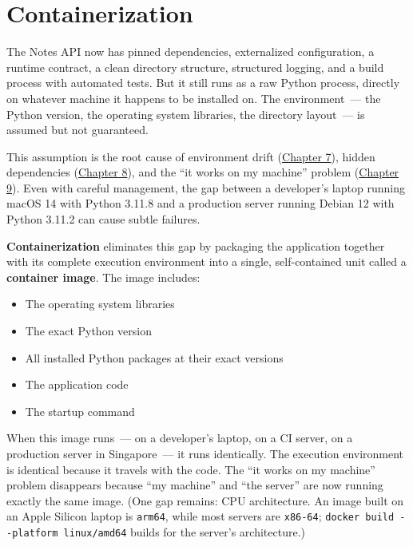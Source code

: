 \setcounter{chapter}{17}
\chapter{Containerization}\label{ch:18-containerization}

\chapterrule

The Notes API now has pinned dependencies, externalized configuration, a runtime contract, a clean directory structure, structured logging, and a build process with automated tests. But it still runs as a raw Python process, directly on whatever machine it happens to be installed on. The environment~--- the Python version, the operating system libraries, the directory layout~--- is assumed but not guaranteed.

This assumption is the root cause of environment drift (\hyperref[ch:07-environment-drift]{Chapter 7}), hidden dependencies (\hyperref[ch:08-hidden-dependencies]{Chapter 8}), and the ``it works on my machine'' problem (\hyperref[ch:09-configuration-coupling]{Chapter 9}). Even with careful management, the gap between a developer's laptop running macOS 14 with Python 3.11.8 and a production server running Debian 12 with Python 3.11.2 can cause subtle failures.

\textbf{Containerization} eliminates this gap by packaging the application together with its complete execution environment into a single, self-contained unit called a \textbf{container image}. The image includes:

\begin{itemize}
\tightlist
\item
  The operating system libraries
\item
  The exact Python version
\item
  All installed Python packages at their exact versions
\item
  The application code
\item
  The startup command
\end{itemize}

\noindent{}When this image runs~--- on a developer's laptop, on a CI server, on a production server in Singapore~--- it runs identically. The execution environment is identical because it travels with the code. The ``it works on my machine'' problem disappears because ``my machine'' and ``the server'' are now running exactly the same image. (One gap remains: CPU architecture. An image built on an Apple Silicon laptop is \texttt{arm64}, while most servers are \texttt{x86-64}; \texttt{docker\ build\ -}\allowbreak{}\texttt{-}\allowbreak{}\texttt{platform\ linux/}\allowbreak{}\texttt{amd64} builds for the server's architecture.)

